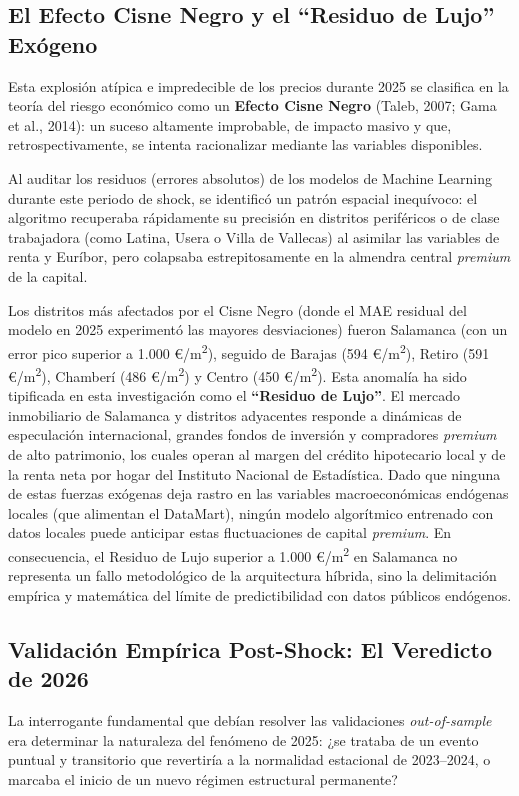 \documentclass[a4paper,11pt,openany]{book}
\begin{document}
\subsection{El Efecto Cisne Negro y el \texorpdfstring{``Residuo de Lujo''}{Residuo de Lujo} Exógeno}
Esta explosión atípica e impredecible de los precios durante 2025 se clasifica en la teoría del riesgo económico como un \textbf{Efecto Cisne Negro} (Taleb, 2007; Gama et al., 2014): un suceso altamente improbable, de impacto masivo y que, retrospectivamente, se intenta racionalizar mediante las variables disponibles.

Al auditar los residuos (errores absolutos) de los modelos de Machine Learning durante este periodo de shock, se identificó un patrón espacial inequívoco: el algoritmo recuperaba rápidamente su precisión en distritos periféricos o de clase trabajadora (como Latina, Usera o Villa de Vallecas) al asimilar las variables de renta y Euríbor, pero colapsaba estrepitosamente en la almendra central \textit{premium} de la capital. 

Los distritos más afectados por el Cisne Negro (donde el MAE residual del modelo en 2025 experimentó las mayores desviaciones) fueron Salamanca (con un error pico superior a 1.000 €/m\textsuperscript{2}), seguido de Barajas (594 €/m\textsuperscript{2}), Retiro (591 €/m\textsuperscript{2}), Chamberí (486 €/m\textsuperscript{2}) y Centro (450 €/m\textsuperscript{2}). Esta anomalía ha sido tipificada en esta investigación como el \textbf{``Residuo de Lujo''}. El mercado inmobiliario de Salamanca y distritos adyacentes responde a dinámicas de especulación internacional, grandes fondos de inversión y compradores \textit{premium} de alto patrimonio, los cuales operan al margen del crédito hipotecario local y de la renta neta por hogar del Instituto Nacional de Estadística. Dado que ninguna de estas fuerzas exógenas deja rastro en las variables macroeconómicas endógenas locales (que alimentan el DataMart), ningún modelo algorítmico entrenado con datos locales puede anticipar estas fluctuaciones de capital \textit{premium}. En consecuencia, el Residuo de Lujo superior a 1.000 €/m\textsuperscript{2} en Salamanca no representa un fallo metodológico de la arquitectura híbrida, sino la delimitación empírica y matemática del límite de predictibilidad con datos públicos endógenos.

\subsection{Validación Empírica Post-Shock: El Veredicto de 2026}
La interrogante fundamental que debían resolver las validaciones \textit{out-of-sample} era determinar la naturaleza del fenómeno de 2025: ¿se trataba de un evento puntual y transitorio que revertiría a la normalidad estacional de 2023--2024, o marcaba el inicio de un nuevo régimen estructural permanente?
\end{document}

